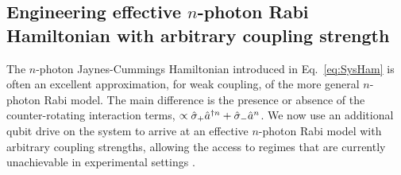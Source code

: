 \subsection{Engineering effective $n$-photon Rabi Hamiltonian with arbitrary coupling strength}\label{sec:QuantumSim}
The $n$-photon Jaynes-Cummings Hamiltonian introduced in Eq.~\eqref{eq:SysHam} is often an excellent approximation, for weak coupling, of the more general $n$-photon Rabi model. The main difference is the presence or absence of the counter-rotating interaction terms, $\propto\hat{\sigma}_+\hat{a}^{\dagger n} + \hat{\sigma}_-\hat{a}^n$. We now use an additional qubit drive on the system to arrive at an effective $n$-photon Rabi model with arbitrary coupling strengths, allowing the access to regimes that are currently unachievable in experimental settings \cite{USCQuantumSim}. 


